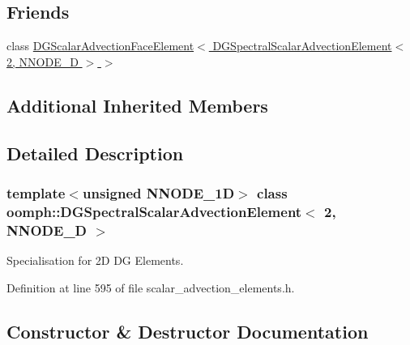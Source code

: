 \subsection*{Friends}
\begin{DoxyCompactItemize}
\item 
class \hyperlink{classoomph_1_1DGSpectralScalarAdvectionElement_3_012_00_01NNODE__1D_01_4_abd5a872b5a40c6a7e8003392b00bee83}{D\+G\+Scalar\+Advection\+Face\+Element$<$ D\+G\+Spectral\+Scalar\+Advection\+Element$<$ 2, N\+N\+O\+D\+E\+\_\+D $>$ $>$}
\end{DoxyCompactItemize}
\subsection*{Additional Inherited Members}


\subsection{Detailed Description}
\subsubsection*{template$<$unsigned N\+N\+O\+D\+E\+\_\+1D$>$\newline
class oomph\+::\+D\+G\+Spectral\+Scalar\+Advection\+Element$<$ 2, N\+N\+O\+D\+E\+\_\+D $>$}

Specialisation for 2D DG Elements. 

Definition at line 595 of file scalar\+\_\+advection\+\_\+elements.\+h.



\subsection{Constructor \& Destructor Documentation}
\mbox{\label{classoomph_1_1DGSpectralScalarAdvectionElement_3_012_00_01NNODE__1D_01_4_a7ae394d987e10a330769da2bc66089bf}} 
